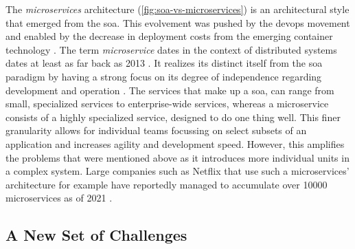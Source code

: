 The \textit{microservices} architecture (\cref{fig:soa-vs-microservices}) is an architectural style that emerged from the \gls{soa}. This evolvement was pushed by the  \gls{devops} movement and enabled by the decrease in deployment costs from the emerging \gls{container} technology \cite{amaral2015performance}.  The term \textit{microservice} dates in the context of distributed systems dates at least as far back as 2013 \cite{fowler-microservices}. It realizes its distinct itself from the \gls{soa}  paradigm by having a strong focus on its degree of independence regarding development and operation \cite{ibm-soa-vs-microservices}. The services that make up a \gls{soa}, can range from small, specialized services to enterprise-wide services, whereas a microservice consists of a highly specialized service, designed to do one thing well. This finer granularity allows for individual teams focussing on select subsets of an application and increases agility and development speed. However, this amplifies the problems that were mentioned above as it introduces more individual units in a complex system. Large companies such as Netflix that use such a microservices' architecture for example have reportedly managed to accumulate over 10000 microservices as of 2021 \cite{netflix-chaos, netflix-svc}.



\subsection{A New Set of Challenges}
\label{sec:background:soa:challenges}



